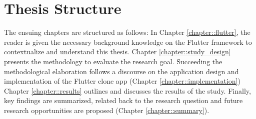 \section{Thesis Structure}
The ensuing chapters are structured as follows:
In Chapter \ref{chapter::flutter}, the reader is given the necessary background knowledge on the Flutter framework to contextualize and understand this thesis. Chapter \ref{chapter::study_design} presents the methodology to evaluate the research goal. 
Succeeding the methodological elaboration follows a discourse on the application design and implementation of the Flutter clone app (Chapter \ref{chapter::implementation})
Chapter \ref{chapter::results} outlines and discusses the results of the study.
Finally, key findings are summarized, related back to the research question and future research opportunities are proposed (Chapter \ref{chapter::summary}).

